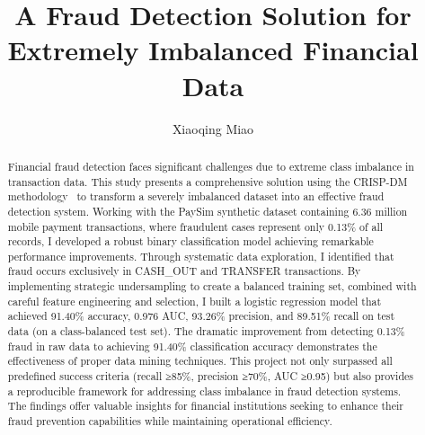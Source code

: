 \documentclass[sigplan,screen]{acmart}
\begin{document}
\title[Data Mining]{ A Fraud Detection Solution for Extremely Imbalanced Financial Data}

\author{Xiaoqing Miao}


\renewcommand{\shortauthors}{Xiaoqing Miao}

\begin{abstract}
\sloppy
Financial fraud detection faces significant challenges due to extreme class imbalance in transaction data. This study presents a comprehensive solution using the CRISP-DM methodology~\cite{shearer2000crisp} to transform a severely imbalanced dataset into an effective fraud detection system. Working with the PaySim synthetic dataset containing 6.36 million mobile payment transactions, where fraudulent cases represent only 0.13\% of all records, I developed a robust binary classification model achieving remarkable performance improvements. Through systematic data exploration, I identified that fraud occurs exclusively in CASH\_OUT and TRANSFER transactions. By implementing strategic undersampling to create a balanced training set, combined with careful feature engineering and selection, I built a logistic regression model that achieved 91.40\% accuracy, 0.976 AUC, 93.26\% precision, and 89.51\% recall on test data (on a class-balanced test set). The dramatic improvement from detecting 0.13\% fraud in raw data to achieving 91.40\% classification accuracy demonstrates the effectiveness of proper data mining techniques. This project not only surpassed all predefined success criteria (recall ≥85\%, precision ≥70\%, AUC ≥0.95) but also provides a reproducible framework for addressing class imbalance in fraud detection systems. The findings offer valuable insights for financial institutions seeking to enhance their fraud prevention capabilities while maintaining operational efficiency.
\fussy
\end{abstract}

\end{document}

